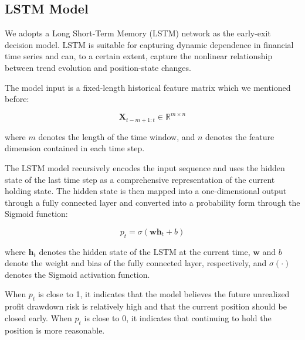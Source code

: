 \documentclass[12pt]{article}
\begin{document}

\subsection{LSTM Model}

We adopts a Long Short-Term Memory (LSTM) network as the early-exit decision model. LSTM is suitable for capturing dynamic dependence in financial time series and can, to a certain extent, capture the nonlinear relationship between trend evolution and position-state changes.

The model input is a fixed-length historical feature matrix which we mentioned before:

\begin{equation}
    \mathbf{X}_{t-m+1:t} \in \mathbb{R}^{m \times n}
\end{equation}

where $m$ denotes the length of the time window, and $n$ denotes the feature dimension contained in each time step.

The LSTM model recursively encodes the input sequence and uses the hidden state of the last time step as a comprehensive representation of the current holding state. The hidden state is then mapped into a one-dimensional output through a fully connected layer and converted into a probability form through the Sigmoid function:

\begin{equation}
    p_t = \sigma(\mathbf{w}\mathbf{h}_t + b)
\end{equation}

where $\mathbf{h}_t$ denotes the hidden state of the LSTM at the current time, $\mathbf{w}$ and $b$ denote the weight and bias of the fully connected layer, respectively, and $\sigma(\cdot)$ denotes the Sigmoid activation function. 


When $p_t$ is close to 1, it indicates that the model believes the future unrealized profit drawdown risk is relatively high and that the current position should be closed early. When $p_t$ is close to 0, it indicates that continuing to hold the position is more reasonable.
\end{document}
